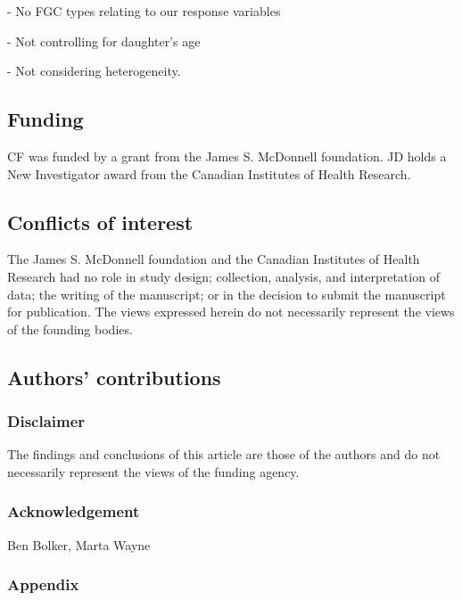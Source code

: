 \documentclass[12pt,]{article}
\begin{document}
- No FGC types relating to our response variables

- Not controlling for daughter’s age

- Not considering heterogeneity.

\subsection{Funding}\label{Funding}

CF was funded by a grant from the James S. McDonnell foundation. JD holds a New Investigator award from the Canadian Institutes of Health Research.

\subsection{Conflicts of interest}\label{Conflicts-of-Interest}

The James S. McDonnell foundation and the Canadian Institutes of Health Research had no role in study design; collection, analysis, and interpretation of data; the writing of the manuscript; or in the decision to submit the manuscript for publication.  The views expressed herein do not necessarily represent the views of the founding bodies.

\subsection{Authors' contributions}\label{Authors'-contributions}

\subsubsection{Disclaimer}\label{disclaimer}

The findings and conclusions of this article are those of the authors
and do not necessarily represent the views of the funding agency.

\subsubsection{Acknowledgement}\label{Acknowledgement}
Ben Bolker,  Marta Wayne

\subsubsection{Appendix}\label{appendix-1}


\end{document}
